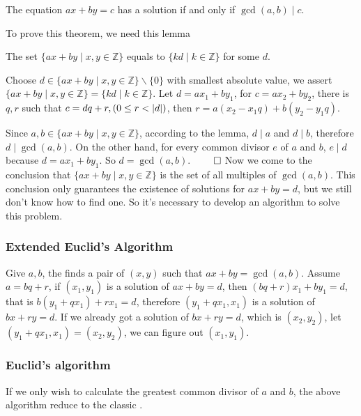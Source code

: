 \begin{thm}
The equation $ax + by = c$ has a solution if and only if $\gcd(a, b) \mid c$.
\end{thm}
To prove this theorem, we need this lemma
\begin{lem}
The set $\{ax + by \mid x, y \in \mathbb{Z}\}$ equals to $\{kd \mid k \in \mathbb{Z}\}$ for some $d$.
\end{lem}
\begin{prf}
Choose $d \in \{ax + by \mid x, y \in \mathbb{Z}\} \backslash \{0\}$ with smallest absolute value,
we assert $\{ax + by \mid x, y \in \mathbb{Z}\} = \{kd \mid k \in \mathbb{Z}\}$.
Let $d = ax_1 + by_1$, for $c = ax_2 + by_2$, there is $q, r$ such that $c = dq + r, (0 \leq r < \left| {d} \right|)$,
then $r = a(x_2 - x_1q) + b(y_2 - y_1q)$.
\end{prf}

Since $a, b \in \{ax + by \mid x, y \in \mathbb{Z}\}$, according to the lemma, $d \mid a$ and $d \mid b$,
therefore $d \mid \gcd(a, b)$. On the other hand, for every common divisor $e$ of $a$ and $b$,
$e \mid d$ because $d = ax_1 + by_1$. So $d = \gcd(a, b)$. $\qed$
Now we come to the conclusion that $\{ax + by \mid x, y \in \mathbb{Z}\}$ is the set of all multiples of $\gcd(a, b)$.
This conclusion only guarantees the existence of solutions for $ax + by = d$, but we still don't know how to find one.
So it's necessary to develop an algorithm to solve this problem.

\subsubsection{Extended Euclid's Algorithm}
Give $a, b$, the  finds a pair of $(x, y)$ such that $ax + by = \gcd(a, b)$.
Assume $a = bq + r$, if $(x_1, y_1)$ is a solution of $ax + by = d$,
then $(bq + r)x_1 + by_1 = d$, that is $b(y_1 + qx_1) + rx_1 = d$,
therefore $(y_1 + qx_1, x_1)$ is a solution of $bx + ry = d$.
If we already got a solution of $bx + ry = d$, which is $(x_2, y_2)$,
let $(y_1 + qx_1, x_1) = (x_2, y_2)$, we can figure out $(x_1, y_1)$.


\subsubsection{Euclid's algorithm}
If we only wish to calculate the greatest common divisor of $a$ and $b$,
the above algorithm reduce to the classic .



